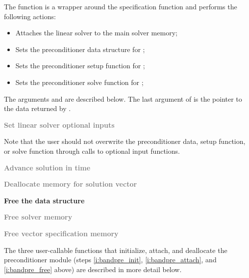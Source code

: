 \begin{Steps}
  The function  is a wrapper around the {\cvspgmr} specification
  function  and performs the following actions:
  \begin{itemize}
    \item Attaches the {\cvspgmr} linear solver to the main {\cvode} solver memory;
    \item Sets the preconditioner data structure for {\cvbandpre};
    \item Sets the preconditioner setup function for {\cvbandpre};
    \item Sets the preconditioner solve function for {\cvbandpre};
  \end{itemize}
  The arguments  and  are described below.
  The last argument of  is the pointer to the {\cvbandpre} data
  returned by .

\item
  \textcolor{gray}{\bf Set linear solver optional inputs}

  Note that the user should not overwrite the preconditioner data, setup function, 
  or solve function through calls to {\cvspgmr} optional input functions.

\item
  \textcolor{gray}{\bf Advance solution in time}

\item
  \textcolor{gray}{\bf Deallocate memory for solution vector}

\item \label{i:bandpre_free}
  {\bf Free the {\cvbandpre} data structure}


\item
  \textcolor{gray}{\bf Free solver memory}
  
\item
  \textcolor{gray}{\bf Free vector specification memory}

\end{Steps}
The three user-callable functions that initialize, attach, and deallocate
the {\cvbandpre} preconditioner module (steps \ref{i:bandpre_init},
\ref{i:bandpre_attach}, and \ref{i:bandpre_free} above) are described
in more detail below.
